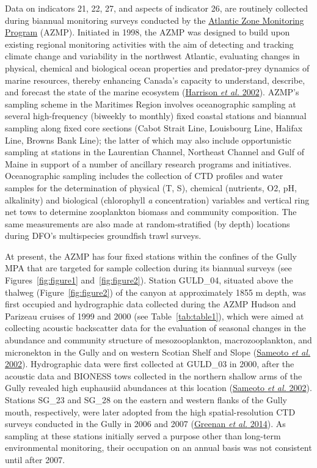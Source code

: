 \documentclass[12pt]{article}\usepackage[]{graphicx}\usepackage[]{color}
\begin{document}
Data on indicators 21, 22, 27, and aspects of indicator 26, are routinely collected during biannual monitoring surveys conducted by the \href{https://www.dfo-mpo.gc.ca/science/data-donnees/azmp-pmza/index-eng.html}{Atlantic Zone Monitoring Program} (AZMP). Initiated in 1998, the AZMP was designed to build upon existing regional monitoring activities with the aim of detecting and tracking climate change and variability in the northwest Atlantic, evaluating changes in physical, chemical and biological ocean properties and predator-prey dynamics of marine resources, thereby enhancing Canada's capacity to understand, describe, and forecast the state of the marine ecosystem (\protect\hyperlink{ref-harrison_2002}{Harrison \textit{et al.} 2002}). AZMP's sampling scheme in the Maritimes Region involves oceanographic sampling at several high-frequency (biweekly to monthly) fixed coastal stations and biannual sampling along fixed core sections (Cabot Strait Line, Louisbourg Line, Halifax Line, Browns Bank Line); the latter of which may also include opportunistic sampling at stations in the Laurentian Channel, Northeast Channel and Gulf of Maine in support of a number of ancillary research programs and initiatives. Oceanographic sampling includes the collection of CTD profiles and water samples for the determination of physical (T, S), chemical (nutrients, O2, pH, alkalinity) and biological (chlorophyll \emph{a} concentration) variables and vertical ring net tows to determine zooplankton biomass and community composition. The same measurements are also made at random-stratified (by depth) locations during DFO's multispecies groundfish trawl surveys.

At present, the AZMP has four fixed stations within the confines of the Gully MPA that are targeted for sample collection during its biannual surveys (see Figures~\ref{fig:figure1} and~\ref{fig:figure2}). Station GULD\_04, situated above the thalweg (Figure~\ref{fig:figure2}) of the canyon at approximately 1855 m depth, was first occupied and hydrographic data collected during the AZMP Hudson and Parizeau cruises of 1999 and 2000 (see Table~\ref{tab:table1}), which were aimed at collecting acoustic backscatter data for the evaluation of seasonal changes in the abundance and community structure of mesozooplankton, macrozooplankton, and micronekton in the Gully and on western Scotian Shelf and Slope (\protect\hyperlink{ref-sameoto_2002}{Sameoto \textit{et al.} 2002}). Hydrographic data were first collected at GULD\_03 in 2000, after the acoustic data and BIONESS tows collected in the northern shallow arms of the Gully revealed high euphausiid abundances at this location (\protect\hyperlink{ref-sameoto_2002}{Sameoto \textit{et al.} 2002}). Stations SG\_23 and SG\_28 on the eastern and western flanks of the Gully mouth, respectively, were later adopted from the high spatial-resolution CTD surveys conducted in the Gully in 2006 and 2007 (\protect\hyperlink{ref-greenan_2014}{Greenan \textit{et al.} 2014}). As sampling at these stations initially served a purpose other than long-term environmental monitoring, their occupation on an annual basis was not consistent until after 2007.
\end{document}
